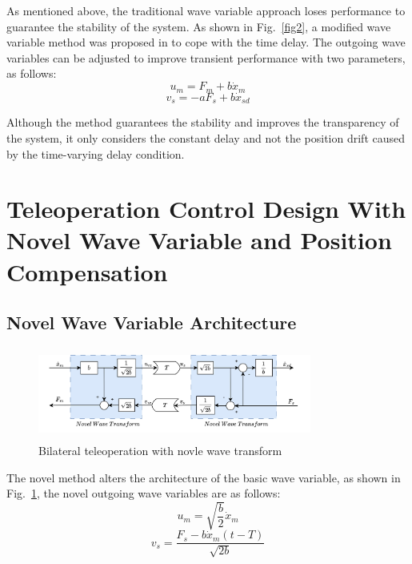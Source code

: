 As mentioned above,
the traditional wave variable approach loses performance to guarantee the stability of the system.
As shown in  Fig.~\ref{fig2},
a modified wave variable method was proposed in \cite{b11} to cope with the time delay.
The outgoing wave variables can be adjusted to improve transient performance with two parameters,
as follows:
\begin{equation}
    u_m = F_m + b \dot x_m\label{eq5}
\end{equation}
\begin{equation}
    v_s = -aF_s + b \dot x_{sd}\label{eq6}
\end{equation}
\par Although the method guarantees the stability
and improves the transparency of the system,
it only considers the constant delay
and not the position drift caused by the time-varying delay condition.

\section{Teleoperation Control Design With Novel Wave Variable and Position Compensation}


\subsection{Novel Wave Variable Architecture}
\begin{figure}[htbp]
    \centerline{\includegraphics[height=3cm,width=9cm]{novel.jpg}}
    \caption{Bilateral teleoperation with novle wave transform}
    \label{fig3}
\end{figure}
The novel method alters the architecture of the basic wave variable,
as shown in Fig.~\ref{fig3}, the novel outgoing wave variables are as follows:
\begin{equation}
    u_m = \sqrt{\frac{b}{2}}\dot x_m\label{eq7}
\end{equation}
\begin{equation}
    v_s = \frac{F_s-b\dot x_m(t-T)}{\sqrt{2b}}\label{eq8}
\end{equation}


